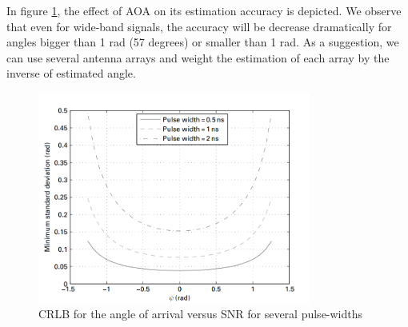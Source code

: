 \documentclass[../../main.tex]{subfiles}
\begin{document}
In figure \ref{fig:aoa_crlb_versus_psi_for_various_pulse_widths}, the effect of AOA on its estimation accuracy is depicted. We observe that even for wide-band signals, the accuracy will be decrease dramatically for angles bigger than 1 rad (57 degrees) or smaller than 1 rad. As a suggestion, we can use several antenna arrays and weight the estimation of each array by the inverse of estimated angle.
\begin{figure}[!htbp]
    \centering
    \includegraphics[width=0.8\textwidth]{aoa_crlb_versus_psi_for_various_pulse_widths}
    \caption{CRLB for the angle of arrival versus SNR for several pulse-widths}
    \label{fig:aoa_crlb_versus_psi_for_various_pulse_widths}
\end{figure}
\end{document}
